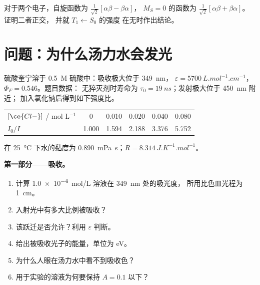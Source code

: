 \begin{exercise}[$\star\star\star$]\label{exo:b3:electronic-spectroscopy:12}
对于两个电子，自旋函数为 $\frac{1}{\sqrt2}[\alpha\beta - \beta\alpha]$，
$M_S = 0$ 的函数为 $\frac{1}{\sqrt2}[\alpha\beta + \beta\alpha]$。证明二者正交，
并就 $T_1 \leftarrow S_0$ 的强度
在无时作出结论。
\end{exercise}

\section{问题：为什么汤力水会发光}

\begin{problem}
\label{pb:b3:electronic-spectroscopy:1}
硫酸奎宁溶于 \qty{0.5}{M} 硫酸中：吸收极大位于 \qty{349}{nm}，
$\varepsilon = \qty{5700}{L.mol^{-1}.cm^{-1}}$，$\Phi_F = 0.546$。题目数据：
无猝灭剂时寿命为 $\tau_0 = \qty{19}{ns}$；发射极大位于 \qty{450}{nm} 附近；
加入氯化钠后得到如下强度比。
\begin{center}\small
\begin{tabular}{lccccc}
\hline
$[\ce{Cl-}]$ / mol L$^{-1}$ & 0 & 0.010 & 0.020 & 0.040 & 0.080 \\
$I_0/I$ & 1.000 & 1.594 & 2.188 & 3.376 & 5.752 \\ \hline
\end{tabular}
\end{center}
在 \qty{25}{\celsius} 下水的黏度为 \qty{0.890}{mPa.s}；$R =
\qty{8.314}{J.K^{-1}.mol^{-1}}$。

\medskip\noindent\textbf{第一部分——吸收。}
\begin{enumerate}
  \item 计算 \qty{1.0e-4}{mol/L} 溶液在 \qty{349}{nm} 处的吸光度，
        所用比色皿光程为 \qty{1}{cm}。
  \item 入射光中有多大比例被吸收？
  \item 该跃迁是否允许？利用 $\varepsilon$ 判断。
  \item 给出被吸收光子的能量，单位为 eV。
  \item 为什么人眼在汤力水中看不到吸收色？
  \item 用于实验的溶液为何要保持 $A = 0.1$ 以下？
\end{enumerate}


\end{problem}

